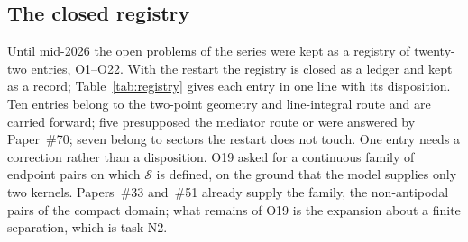 \documentclass[%
 reprint, amsmath,amssymb, aps, prb, ]{revtex4-2}
\numberwithin{equation}{section}
\begin{document}
\subsection{The closed registry}

Until mid-2026 the open problems of the series were kept as a registry of twenty-two entries, O1--O22. With the restart the registry is closed as a ledger and kept as a record; Table~\ref{tab:registry} gives each entry in one line with its disposition. Ten entries belong to the two-point geometry and line-integral route and are carried forward; five presupposed the mediator route or were answered by Paper~\#70; seven belong to sectors the restart does not touch. One entry needs a correction rather than a disposition. O19 asked for a continuous family of endpoint pairs on which $\mathcal S$ is defined, on the ground that the model supplies only two kernels. Papers~\#33 and~\#51 already supply the family, the non-antipodal pairs of the compact domain; what remains of O19 is the expansion about a finite separation, which is task N2.
\end{document}
